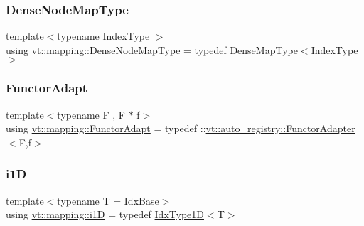 \mbox{\label{namespacevt_1_1mapping_a224f382367a2c65c3be2a9f91f89ffd5}} 
\subsubsection{\texorpdfstring{Dense\+Node\+Map\+Type}{DenseNodeMapType}}
{\footnotesize\ttfamily template$<$typename Index\+Type $>$ \\
using \hyperlink{namespacevt_1_1mapping_a224f382367a2c65c3be2a9f91f89ffd5}{vt\+::mapping\+::\+Dense\+Node\+Map\+Type} = typedef \hyperlink{namespacevt_1_1mapping_a64f0fc107b569bb6644f1b015c6e7ad8}{Dense\+Map\+Type}$<$Index\+Type$>$}

\mbox{\label{namespacevt_1_1mapping_a9502cb3a918b8389f64351638edab39f}} 
\subsubsection{\texorpdfstring{Functor\+Adapt}{FunctorAdapt}}
{\footnotesize\ttfamily template$<$typename F , F $\ast$ f$>$ \\
using \hyperlink{namespacevt_1_1mapping_a9502cb3a918b8389f64351638edab39f}{vt\+::mapping\+::\+Functor\+Adapt} = typedef \+::\hyperlink{structvt_1_1auto__registry_1_1_functor_adapter}{vt\+::auto\+\_\+registry\+::\+Functor\+Adapter}$<$F,f$>$}

\mbox{\label{namespacevt_1_1mapping_af0c14a9a77e0311b3d089143ed93ba76}} 
\subsubsection{\texorpdfstring{i1D}{i1D}}
{\footnotesize\ttfamily template$<$typename T  = Idx\+Base$>$ \\
using \hyperlink{namespacevt_1_1mapping_af0c14a9a77e0311b3d089143ed93ba76}{vt\+::mapping\+::i1D} = typedef \hyperlink{namespacevt_a36127c6500f2311908c959be653da40e}{Idx\+Type1D}$<$T$>$}

\mbox{\label{namespacevt_1_1mapping_a6448c875e0807b43f31e96fc5b0cec04}} 
